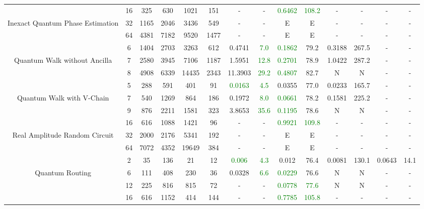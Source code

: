 \begin{table}[htb]
{\begin{tabular}{|c|c|c|c|c|c|c|c|c|c|c|c|c|c|}
\hline
 & 
16 & 325 & 630 & 1021 & 151
 & - & -
 & \textcolor{green}{0.6462} & \textcolor{green}{108.2}
 & - & -
 & - & -
 \\
Inexact Quantum Phase Estimation & 
32 & 1165 & 2046 & 3436 & 549
 & - & -
 & E & E
 & - & -
 & - & -
 \\
 & 
64 & 4381 & 7182 & 9520 & 1477
 & - & -
 & E & E
 & - & -
 & - & -
 \\
\hline
 & 
6 & 1404 & 2703 & 3263 & 612
 & 0.4741 & \textcolor{green}{7.0}
 & \textcolor{green}{0.1862} & 79.2
 & 0.3188 & 267.5
 & - & -
 \\
Quantum Walk without Ancilla & 
7 & 2580 & 3945 & 7106 & 1187
 & 1.5951 & \textcolor{green}{12.8}
 & \textcolor{green}{0.2701} & 78.9
 & 1.0422 & 287.2
 & - & -
 \\
 & 
8 & 4908 & 6339 & 14435 & 2343
 & 11.3903 & \textcolor{green}{29.2}
 & \textcolor{green}{0.4807} & 82.7
 & N & N 
 & - & -
 \\
\hline
 & 
5 & 288 & 591 & 401 & 91
 & \textcolor{green}{0.0163} & \textcolor{green}{4.5}
 & 0.0355 & 77.0
 & 0.0233 & 165.7
 & - & -
 \\
Quantum Walk with V-Chain & 
7 & 540 & 1269 & 864 & 186
 & 0.1972 & \textcolor{green}{8.0}
 & \textcolor{green}{0.0661} & 78.2
 & 0.1581 & 225.2
 & - & -
 \\
 & 
9 & 876 & 2211 & 1581 & 323
 & 3.8653 & \textcolor{green}{35.6}
 & \textcolor{green}{0.1195} & 78.6
 & N & N 
 & - & -
 \\
\hline
 & 
16 & 616 & 1088 & 1421 & 96
 & - & -
 & \textcolor{green}{0.9921} & \textcolor{green}{109.8}
 & - & -
 & - & -
 \\
Real Amplitude Random Circuit & 
32 & 2000 & 2176 & 5341 & 192
 & - & -
 & E & E
 & - & -
 & - & -
 \\
 & 
64 & 7072 & 4352 & 19649 & 384
 & - & -
 & E & E
 & - & -
 & - & -
 \\
\hline
 & 
2 & 35 & 136 & 21 & 12
 & \textcolor{green}{0.006} & \textcolor{green}{4.3}
 & 0.012 & 76.4
 & 0.0081 & 130.1
 & 0.0643 & 14.1
 \\
Quantum Routing & 
6 & 111 & 408 & 230 & 36
 & 0.0328 & \textcolor{green}{6.6}
 & \textcolor{green}{0.0229} & 76.6
 & N & N 
 & - & -
 \\
 & 
12 & 225 & 816 & 815 & 72
 & - & -
 & \textcolor{green}{0.0778} & \textcolor{green}{77.6}
 & N & N 
 & - & -
 \\
\hline
 & 
16 & 616 & 1152 & 414 & 144
 & - & -
 & \textcolor{green}{0.7785} & \textcolor{green}{105.8}
 & - & -
 & - & -
 \\

\end{tabular}}
\end{table}

